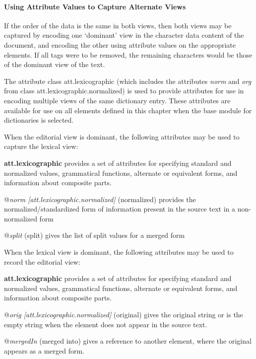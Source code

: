 \paragraph[{Using Attribute Values to Capture Alternate Views}]{Using Attribute Values to Capture Alternate Views}\label{DIMVAV}\par
If the order of the data is the same in both views, then both views may be captured by encoding one ‘dominant’ view in the character data content of the document, and encoding the other using attribute values on the appropriate elements. If all tags were to be removed, the remaining characters would be those of the dominant view of the text.\par
The attribute class \textsf{att.lexicographic} (which includes the attributes {\itshape norm} and {\itshape org} from class \textsf{att.lexicographic.normalized}) is used to provide attributes for use in encoding multiple views of the same dictionary entry. These attributes are available for use on all elements defined in this chapter when the base module for dictionaries is selected.\par
When the editorial view is dominant, the following attributes may be used to capture the lexical view:
\begin{sansreflist}
  
\item [\textbf{att.lexicographic}] provides a set of attributes for specifying standard and normalized values, grammatical functions, alternate or equivalent forms, and information about composite parts.\hfil\\[-10pt]\begin{sansreflist}
    \item[@{\itshape norm [att.lexicographic.normalized]}]
  (normalized) provides the normalized/standardized form of information present in the source text in a non-normalized form
    \item[@{\itshape split}]
  (split) gives the list of split values for a merged form
\end{sansreflist}  
\end{sansreflist}
\par
When the lexical view is dominant, the following attributes may be used to record the editorial view:
\begin{sansreflist}
  
\item [\textbf{att.lexicographic}] provides a set of attributes for specifying standard and normalized values, grammatical functions, alternate or equivalent forms, and information about composite parts.\hfil\\[-10pt]\begin{sansreflist}
    \item[@{\itshape orig [att.lexicographic.normalized]}]
  (original) gives the original string or is the empty string when the element does not appear in the source text.
    \item[@{\itshape mergedIn}]
  (merged into) gives a reference to another element, where the original appears as a merged form.
\end{sansreflist}  
\end{sansreflist}
